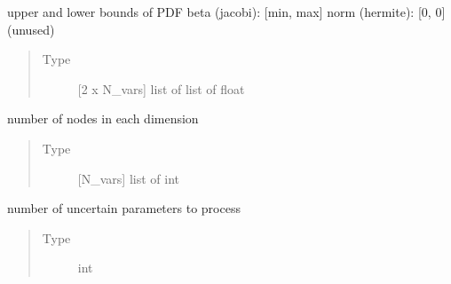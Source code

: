 \documentclass[letterpaper,10pt,english,openany,oneside]{sphinxmanual}
\begin{document}
\begin{fulllineitems}
\begin{fulllineitems}
\begin{quote}
\begin{description}
\end{description}\end{quote}

\end{fulllineitems}


\begin{fulllineitems}
\label{\detokenize{pygpc:pygpc.grid.TensorGrid.limits}}
upper and lower bounds of PDF
beta (jacobi):  {[}min, max{]}
norm (hermite): {[}0, 0{]} (unused)
\begin{quote}\begin{description}
\item[{Type}] \leavevmode
{[}2 x N\_vars{]} list of list of float

\end{description}\end{quote}

\end{fulllineitems}


\begin{fulllineitems}
\label{\detokenize{pygpc:pygpc.grid.TensorGrid.N}}
number of nodes in each dimension
\begin{quote}\begin{description}
\item[{Type}] \leavevmode
{[}N\_vars{]} list of int

\end{description}\end{quote}

\end{fulllineitems}


\begin{fulllineitems}
\label{\detokenize{pygpc:pygpc.grid.TensorGrid.dim}}
number of uncertain parameters to process
\begin{quote}\begin{description}
\item[{Type}] \leavevmode
int

\end{description}\end{quote}

\end{fulllineitems}


\end{fulllineitems}
\end{document}
